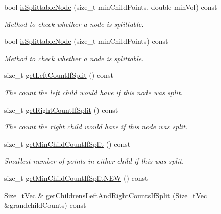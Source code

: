 \begin{DoxyCompactItemize}
\item 
bool \hyperlink{classsubpavings_1_1SPSnode_af8f9559a17318b187769c20e85316135}{is\-Splittable\-Node} (size\-\_\-t min\-Child\-Points, double min\-Vol) const 
\begin{DoxyCompactList}\small\item\em \-Method to check whether a node is splittable. \end{DoxyCompactList}\item 
bool \hyperlink{classsubpavings_1_1SPSnode_acba45b1fe208f6218a87400eb454b28d}{is\-Splittable\-Node} (size\-\_\-t min\-Child\-Points) const 
\begin{DoxyCompactList}\small\item\em \-Method to check whether a node is splittable. \end{DoxyCompactList}\item 
size\-\_\-t \hyperlink{classsubpavings_1_1SPSnode_ad077233e00a7093d66e35cca6fc6db6b}{get\-Left\-Count\-If\-Split} () const 
\begin{DoxyCompactList}\small\item\em \-The count the left child would have if this node was split. \end{DoxyCompactList}\item 
size\-\_\-t \hyperlink{classsubpavings_1_1SPSnode_aa10917d57d9a50cb2d393a422188a51f}{get\-Right\-Count\-If\-Split} () const 
\begin{DoxyCompactList}\small\item\em \-The count the right child would have if this node was split. \end{DoxyCompactList}\item 
size\-\_\-t \hyperlink{classsubpavings_1_1SPSnode_a1b3356a466432a282290af76df3adb08}{get\-Min\-Child\-Count\-If\-Split} () const 
\begin{DoxyCompactList}\small\item\em \-Smallest number of points in either child if this was split. \end{DoxyCompactList}\item 
size\-\_\-t \hyperlink{classsubpavings_1_1SPSnode_a3df75e24c4a3a468b63f79667645c1dc}{get\-Min\-Child\-Count\-If\-Split\-N\-E\-W} () const 
\item 
\hyperlink{namespacesubpavings_a612fc5639b45583b9fd33bd304354f81}{\-Size\-\_\-t\-Vec} \& \hyperlink{classsubpavings_1_1SPSnode_acbe47754c218f0c895a900330491cbb3}{get\-Childrens\-Left\-And\-Right\-Counts\-If\-Split} (\hyperlink{namespacesubpavings_a612fc5639b45583b9fd33bd304354f81}{\-Size\-\_\-t\-Vec} \&grandchild\-Counts) const 

\end{DoxyCompactItemize}
